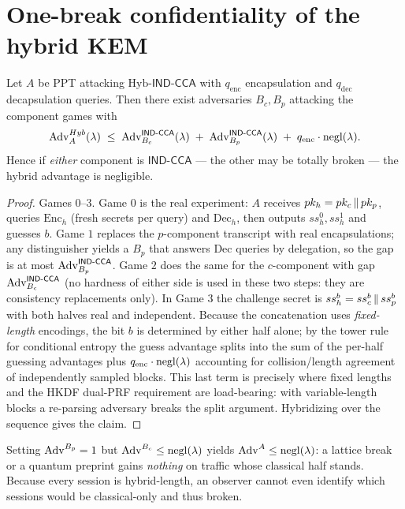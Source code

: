 \section{One-break confidentiality of the hybrid KEM}
\label{sec:thm1}
\begin{theorem}
\label{thm:hybrid}
Let $A$ be PPT attacking $\mathrm{Hyb}$-$\mathsf{IND\text{-}CCA}$ with
$q_{\mathrm{enc}}$ encapsulation and $q_{\mathrm{dec}}$ decapsulation queries.
Then there exist adversaries $B_c,B_p$ attacking the component games with
\[
  \mathrm{Adv}^{Hyb}_A(\lambda)
  \;\le\;
  \mathrm{Adv}^{\mathsf{IND\text{-}CCA}}_{B_c}(\lambda)
  \;+\;
  \mathrm{Adv}^{\mathsf{IND\text{-}CCA}}_{B_p}(\lambda)
  \;+\;
  q_{\mathrm{enc}}\cdot\mathrm{negl}(\lambda) .
\]
Hence if \emph{either} component is $\mathsf{IND\text{-}CCA}$ --- the other may
be totally broken --- the hybrid advantage is negligible.
\end{theorem}

\begin{proof}
Games $0$--$3$. Game $0$ is the real experiment: $A$ receives
$pk_h = pk_c\,\|\, pk_p$, queries $\mathrm{Enc}_h$ (fresh secrets per query)
and $\mathrm{Dec}_h$, then outputs $ss_h^0, ss_h^1$ and guesses $b$.
Game $1$ replaces the $p$-component transcript with real encapsulations; any
distinguisher yields a $B_p$ that answers $\mathrm{Dec}$ queries by delegation,
so the gap is at most $\mathrm{Adv}^{\mathsf{IND\text{-}CCA}}_{B_p}$. Game $2$ does the
same for the $c$-component with gap $\mathrm{Adv}^{\mathsf{IND\text{-}CCA}}_{B_c}$
(no hardness of either side is used in these two steps: they are consistency
replacements only). In Game $3$ the challenge secret is
$ss_h^b = ss_c^b \,\|\, ss_p^b$ with both halves real and independent.
Because the concatenation uses \emph{fixed-length} encodings, the bit $b$ is
determined by either half alone; by the tower rule for conditional entropy the
guess advantage splits into the sum of the per-half guessing advantages plus
$q_{\mathrm{enc}}\cdot\mathrm{negl}(\lambda)$ accounting for collision/length agreement of
independently sampled blocks. This last term is precisely where fixed lengths
and the HKDF dual-PRF requirement are load-bearing: with variable-length
blocks a re-parsing adversary breaks the split argument. Hybridizing over the
sequence gives the claim.
\end{proof}

\begin{corollary}
\label{corr:e1}
Setting $\mathrm{Adv}^{B_p} = 1$ but $\mathrm{Adv}^{B_c} \le \mathrm{negl}(\lambda)$ yields
$\mathrm{Adv}^{A} \le \mathrm{negl}(\lambda)$: a lattice break or a quantum preprint gains \emph{nothing}
on traffic whose classical half stands. Because every session is
hybrid-length, an observer cannot even identify which sessions would be
classical-only and thus broken.
\end{corollary}

